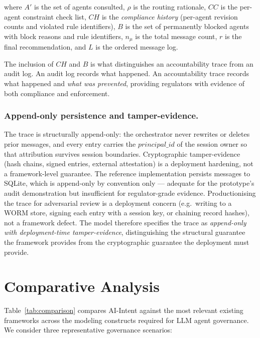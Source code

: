 \documentclass[runningheads]{llncs}
\begin{document}
\noindent where $A'$ is the set of agents consulted, $\rho$ is the
routing rationale, $\mathit{CC}$ is the per-agent constraint check list,
$\mathit{CH}$ is the \emph{compliance history} (per-agent revision counts
and violated rule identifiers), $B$ is the set of permanently blocked
agents with block reasons and rule identifiers, $n_\mu$ is the total
message count, $r$ is the final recommendation, and $L$ is the ordered
message log.

The inclusion of $\mathit{CH}$ and $B$ is what distinguishes an
accountability trace from an audit log. An audit log records what
happened. An accountability trace records what happened and
\emph{what was prevented}, providing regulators with evidence of
both compliance and enforcement.

\subsubsection{Append-only persistence and tamper-evidence.}

The trace is structurally append-only: the orchestrator never
rewrites or deletes prior messages, and every entry carries the
$\mathit{principal\_id}$ of the session owner so that attribution
survives session boundaries. Cryptographic tamper-evidence (hash
chains, signed entries, external attestation) is a deployment
hardening, not a framework-level guarantee. The reference
implementation persists messages to SQLite, which is append-only by
convention only --- adequate for the prototype's audit demonstration
but insufficient for regulator-grade evidence. Productionising the
trace for adversarial review is a deployment concern (e.g.\ writing
to a WORM store, signing each entry with a session key, or chaining
record hashes), not a framework defect. The model therefore
specifies the trace as \emph{append-only with deployment-time
tamper-evidence}, distinguishing the structural guarantee the
framework provides from the cryptographic guarantee the deployment
must provide.

\section{Comparative Analysis}
\label{sec:comparison}

Table~\ref{tab:comparison} compares AI-Intent against the most relevant
existing frameworks across the modeling constructs required for LLM
agent governance. We consider three representative governance scenarios:
\end{document}
